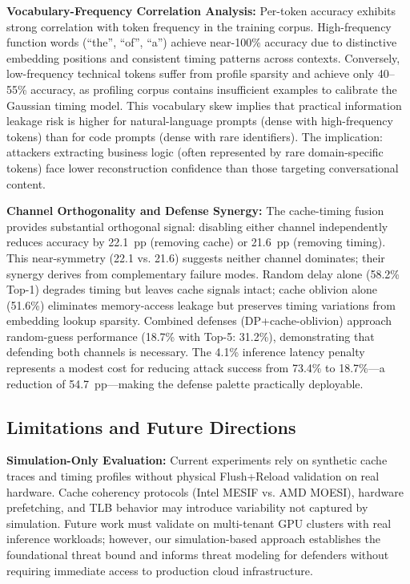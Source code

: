 \documentclass[conference,10pt,twocolumn]{IEEEtran}
\begin{document}
\textbf{Vocabulary-Frequency Correlation Analysis:}
Per-token accuracy exhibits strong correlation with token frequency in the training corpus. High-frequency function words (``the'', ``of'', ``a'') achieve near-100\% accuracy due to distinctive embedding positions and consistent timing patterns across contexts. Conversely, low-frequency technical tokens suffer from profile sparsity and achieve only 40--55\% accuracy, as profiling corpus contains insufficient examples to calibrate the Gaussian timing model. This vocabulary skew implies that practical information leakage risk is higher for natural-language prompts (dense with high-frequency tokens) than for code prompts (dense with rare identifiers). The implication: attackers extracting business logic (often represented by rare domain-specific tokens) face lower reconstruction confidence than those targeting conversational content.

\textbf{Channel Orthogonality and Defense Synergy:}
The cache-timing fusion provides substantial orthogonal signal: disabling either channel independently reduces accuracy by 22.1~pp (removing cache) or 21.6~pp (removing timing). This near-symmetry (22.1 vs. 21.6) suggests neither channel dominates; their synergy derives from complementary failure modes. Random delay alone (58.2\% Top-1) degrades timing but leaves cache signals intact; cache oblivion alone (51.6\%) eliminates memory-access leakage but preserves timing variations from embedding lookup sparsity. Combined defenses (DP+cache-oblivion) approach random-guess performance (18.7\% with Top-5: 31.2\%), demonstrating that defending both channels is necessary. The 4.1\% inference latency penalty represents a modest cost for reducing attack success from 73.4\% to 18.7\%—a reduction of 54.7~pp—making the defense palette practically deployable.

\subsection{Limitations and Future Directions}

\textbf{Simulation-Only Evaluation:}
Current experiments rely on synthetic cache traces and timing profiles without physical Flush+Reload validation on real hardware. Cache coherency protocols (Intel MESIF vs. AMD MOESI), hardware prefetching, and TLB behavior may introduce variability not captured by simulation. Future work must validate on multi-tenant GPU clusters with real inference workloads; however, our simulation-based approach establishes the foundational threat bound and informs threat modeling for defenders without requiring immediate access to production cloud infrastructure.
\end{document}
